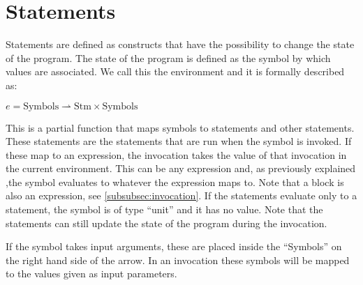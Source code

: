 \section{Statements}\label{sec:statements}
Statements are defined as constructs that have the possibility to change the state of the program. The state of the program is defined as the symbol by which values are associated. We call this the environment and it is formally described as:
\begin{center}
$e = \text{Symbols} \rightharpoonup \text{Stm} \times \text{Symbols}$
\end{center}
This is a partial function that maps symbols to statements and other statements. These statements are the statements that are run when the symbol is invoked. If these map to an expression, the invocation takes the value of that invocation in the current environment. This can be any expression and, as previously explained ,the symbol evaluates to whatever the expression maps to. Note that a block is also an expression, see \cref{subsubsec:invocation}. If the statements evaluate only to a statement, the symbol is of type \enquote{unit} and it has no value. Note that the statements can still update the state of the program during the invocation. 

If the symbol takes input arguments, these are placed inside the \enquote{Symbols} on the right hand side of the arrow. In an invocation these symbols will be mapped to the values given as input parameters.







